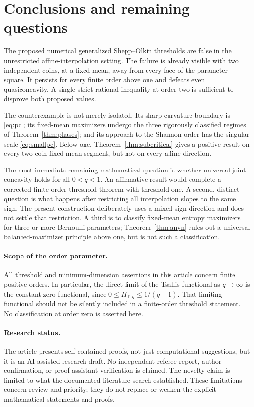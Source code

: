 \documentclass[11pt]{article}
\numberwithin{equation}{section}
\theoremstyle{definition}
\theoremstyle{remark}
\begin{document}
\section{Conclusions and remaining questions}
The proposed numerical generalized Shepp--Olkin thresholds are false in the
unrestricted affine-interpolation setting. The failure is already visible
with two independent coins, at a fixed mean, away from every face of the
parameter square. It persists for every finite order above one and defeats
even quasiconcavity. A single strict rational inequality at order two is
sufficient to disprove both proposed values.

The counterexample is not merely isolated. Its sharp curvature boundary is
\eqref{eq:pc}; its fixed-mean maximizers undergo the three rigorously
classified regimes of Theorem~\ref{thm:phases}; and its approach to the
Shannon order has the singular scale \eqref{eq:smallpc}. Below one,
Theorem~\ref{thm:subcritical} gives a positive result on every two-coin
fixed-mean segment, but not on every affine direction.

The most immediate remaining mathematical question is whether universal
joint concavity holds for all $0<q<1$. An affirmative result would complete
a corrected finite-order threshold theorem with threshold one. A second,
distinct question is what happens after restricting all interpolation
slopes to the same sign. The present construction deliberately uses a
mixed-sign direction and does not settle that restriction. A third is to
classify fixed-mean entropy maximizers for three or more Bernoulli
parameters; Theorem~\ref{thm:anyn} rules out a universal balanced-maximizer
principle above one, but is not such a classification.

\paragraph{Scope of the order parameter.}
All threshold and minimum-dimension assertions in this article concern
finite positive orders. In particular, the direct limit of the Tsallis
functional as $q\to\infty$ is the constant zero functional, since
$0\leq H_{\mathrm T,q}\leq1/(q-1)$. That limiting functional should not be
silently included in a finite-order threshold statement. No classification
at order zero is asserted here.

\paragraph{Research status.}
The article presents self-contained proofs, not just computational
suggestions, but it is an AI-assisted research draft. No independent referee
report, author confirmation, or proof-assistant verification is claimed.
The novelty claim is limited to what the documented literature search
established. These limitations concern review and priority; they do not
replace or weaken the explicit mathematical statements and proofs.
\end{document}
